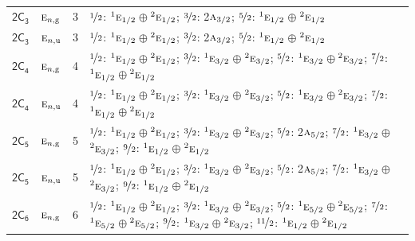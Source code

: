 \documentclass[10pt,a4paper]{article}
\numberwithin{equation}{section}
\newcommand{\grp}[1]{\mathsf{#1}}
\newcommand{\irr}[1]{\text{\normalfont\scshape #1}}
\newcommand{\conjpair}[1]{{}^{#1}}
\newcommand{\ptag}[1]{\mathrm{#1}}
\newlength{\fillwidth}\newlength{\cellwidth}\newlength{\colwidth}
\begin{document}
{\begin{longtable}{@{}llr>{\RaggedRight\arraybackslash}p{\fillwidth}@{}}
\href{2C3.pdf}{$\grp{2C_{3}}$} & $\irr{e}_{n,\ptag{g}}$ & 3 & $\nicefrac{1}{2}$: $\conjpair{1}\irr{e}_{1/2}$${}\oplus{}$$\conjpair{2}\irr{e}_{1/2}$; $\nicefrac{3}{2}$: 2$\irr{a}_{3/2}$; $\nicefrac{5}{2}$: $\conjpair{1}\irr{e}_{1/2}$${}\oplus{}$$\conjpair{2}\irr{e}_{1/2}$\\
\href{2C3.pdf}{$\grp{2C_{3}}$} & $\irr{e}_{n,\ptag{u}}$ & 3 & $\nicefrac{1}{2}$: $\conjpair{1}\irr{e}_{1/2}$${}\oplus{}$$\conjpair{2}\irr{e}_{1/2}$; $\nicefrac{3}{2}$: 2$\irr{a}_{3/2}$; $\nicefrac{5}{2}$: $\conjpair{1}\irr{e}_{1/2}$${}\oplus{}$$\conjpair{2}\irr{e}_{1/2}$\\
\href{2C4.pdf}{$\grp{2C_{4}}$} & $\irr{e}_{n,\ptag{g}}$ & 4 & $\nicefrac{1}{2}$: $\conjpair{1}\irr{e}_{1/2}$${}\oplus{}$$\conjpair{2}\irr{e}_{1/2}$; $\nicefrac{3}{2}$: $\conjpair{1}\irr{e}_{3/2}$${}\oplus{}$$\conjpair{2}\irr{e}_{3/2}$; $\nicefrac{5}{2}$: $\conjpair{1}\irr{e}_{3/2}$${}\oplus{}$$\conjpair{2}\irr{e}_{3/2}$; $\nicefrac{7}{2}$: $\conjpair{1}\irr{e}_{1/2}$${}\oplus{}$$\conjpair{2}\irr{e}_{1/2}$\\
\href{2C4.pdf}{$\grp{2C_{4}}$} & $\irr{e}_{n,\ptag{u}}$ & 4 & $\nicefrac{1}{2}$: $\conjpair{1}\irr{e}_{1/2}$${}\oplus{}$$\conjpair{2}\irr{e}_{1/2}$; $\nicefrac{3}{2}$: $\conjpair{1}\irr{e}_{3/2}$${}\oplus{}$$\conjpair{2}\irr{e}_{3/2}$; $\nicefrac{5}{2}$: $\conjpair{1}\irr{e}_{3/2}$${}\oplus{}$$\conjpair{2}\irr{e}_{3/2}$; $\nicefrac{7}{2}$: $\conjpair{1}\irr{e}_{1/2}$${}\oplus{}$$\conjpair{2}\irr{e}_{1/2}$\\
\href{2C5.pdf}{$\grp{2C_{5}}$} & $\irr{e}_{n,\ptag{g}}$ & 5 & $\nicefrac{1}{2}$: $\conjpair{1}\irr{e}_{1/2}$${}\oplus{}$$\conjpair{2}\irr{e}_{1/2}$; $\nicefrac{3}{2}$: $\conjpair{1}\irr{e}_{3/2}$${}\oplus{}$$\conjpair{2}\irr{e}_{3/2}$; $\nicefrac{5}{2}$: 2$\irr{a}_{5/2}$; $\nicefrac{7}{2}$: $\conjpair{1}\irr{e}_{3/2}$${}\oplus{}$$\conjpair{2}\irr{e}_{3/2}$; $\nicefrac{9}{2}$: $\conjpair{1}\irr{e}_{1/2}$${}\oplus{}$$\conjpair{2}\irr{e}_{1/2}$\\
\href{2C5.pdf}{$\grp{2C_{5}}$} & $\irr{e}_{n,\ptag{u}}$ & 5 & $\nicefrac{1}{2}$: $\conjpair{1}\irr{e}_{1/2}$${}\oplus{}$$\conjpair{2}\irr{e}_{1/2}$; $\nicefrac{3}{2}$: $\conjpair{1}\irr{e}_{3/2}$${}\oplus{}$$\conjpair{2}\irr{e}_{3/2}$; $\nicefrac{5}{2}$: 2$\irr{a}_{5/2}$; $\nicefrac{7}{2}$: $\conjpair{1}\irr{e}_{3/2}$${}\oplus{}$$\conjpair{2}\irr{e}_{3/2}$; $\nicefrac{9}{2}$: $\conjpair{1}\irr{e}_{1/2}$${}\oplus{}$$\conjpair{2}\irr{e}_{1/2}$\\
\href{2C6.pdf}{$\grp{2C_{6}}$} & $\irr{e}_{n,\ptag{g}}$ & 6 & $\nicefrac{1}{2}$: $\conjpair{1}\irr{e}_{1/2}$${}\oplus{}$$\conjpair{2}\irr{e}_{1/2}$; $\nicefrac{3}{2}$: $\conjpair{1}\irr{e}_{3/2}$${}\oplus{}$$\conjpair{2}\irr{e}_{3/2}$; $\nicefrac{5}{2}$: $\conjpair{1}\irr{e}_{5/2}$${}\oplus{}$$\conjpair{2}\irr{e}_{5/2}$; $\nicefrac{7}{2}$: $\conjpair{1}\irr{e}_{5/2}$${}\oplus{}$$\conjpair{2}\irr{e}_{5/2}$; $\nicefrac{9}{2}$: $\conjpair{1}\irr{e}_{3/2}$${}\oplus{}$$\conjpair{2}\irr{e}_{3/2}$; $\nicefrac{11}{2}$: $\conjpair{1}\irr{e}_{1/2}$${}\oplus{}$$\conjpair{2}\irr{e}_{1/2}$\\

\end{longtable}}
\end{document}
